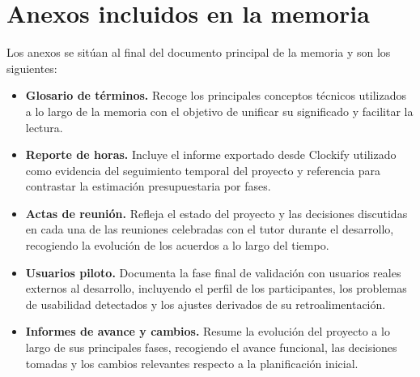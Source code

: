 \documentclass[11pt,a4paper]{article}
\begin{document}
\section*{Anexos incluidos en la memoria}

Los anexos se sit\'uan al final del documento principal de la memoria y son los siguientes:

\begin{itemize}[leftmargin=1.5em]
    \item \textbf{Glosario de t\'erminos.} Recoge los principales conceptos t\'ecnicos utilizados a lo largo de la memoria con el objetivo de unificar su significado y facilitar la lectura.

    \item \textbf{Reporte de horas.} Incluye el informe exportado desde Clockify utilizado como evidencia del seguimiento temporal del proyecto y referencia para contrastar la estimaci\'on presupuestaria por fases.

    \item \textbf{Actas de reuni\'on.} Refleja el estado del proyecto y las decisiones discutidas en cada una de las reuniones celebradas con el tutor durante el desarrollo, recogiendo la evoluci\'on de los acuerdos a lo largo del tiempo.

    \item \textbf{Usuarios piloto.} Documenta la fase final de validaci\'on con usuarios reales externos al desarrollo, incluyendo el perfil de los participantes, los problemas de usabilidad detectados y los ajustes derivados de su retroalimentaci\'on.

    \item \textbf{Informes de avance y cambios.} Resume la evoluci\'on del proyecto a lo largo de sus principales fases, recogiendo el avance funcional, las decisiones tomadas y los cambios relevantes respecto a la planificaci\'on inicial.
\end{itemize}
\end{document}
